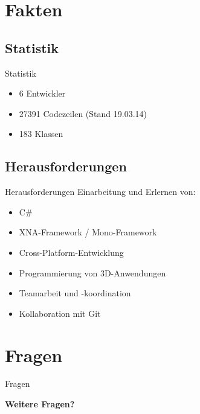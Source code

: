 \documentclass[18pt]{beamer}
\begin{document}
\section{Fakten}
\subsection{Statistik}
\begin{frame}{Statistik}
\begin{itemize}
\item 6 Entwickler
\item 27391 Codezeilen (Stand 19.03.14)
\item 183 Klassen
\end{itemize}
\end{frame}

\subsection{Herausforderungen}
\begin{frame} {Herausforderungen}
Einarbeitung und Erlernen von:
\begin{itemize}
\item C\#
\item XNA-Framework / Mono-Framework
\item Cross-Platform-Entwicklung
\item Programmierung von 3D-Anwendungen
\item Teamarbeit und -koordination
\item Kollaboration mit Git
\end{itemize}
\end{frame}


\section{Fragen}
\begin{frame}{Fragen}
\begin{center}
\Huge \textbf{Weitere Fragen?}
\end{center}
\end{frame}



%
%
\end{document}
